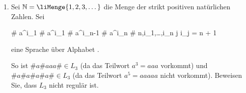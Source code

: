 \documentclass{bschlangaul-aufgabe}
\begin{document}
\begin{enumerate}

\item Sei $\mathbb{N} = \liMenge{1,2,3,\dots}$ die Menge der strikt
positiven natürlichen Zahlen. Sei

\liAusdruck[L_3]
%
{\# a^{i_1} \# a^{i_1} \# \cdots a^{i_{n-1}} \# a^{i_n} \#}
%
{n,i_1,\dots,i_n \in {}
j \in {}
i_j = n + 1}

eine Sprache über Alphabet .

So ist \zB $\#a\#aaa\# \in L_3$ (da das Teilwort $a^3 = aaa$ vorkommt)
und $\#a\#a\#a\#a\# \in L_3$ (da das Teilwort $a^5 = aaaaa$ nicht
vorkommt). Beweisen Sie, dass $L_3$ nicht regulär ist.

\end{enumerate}
\end{document}
